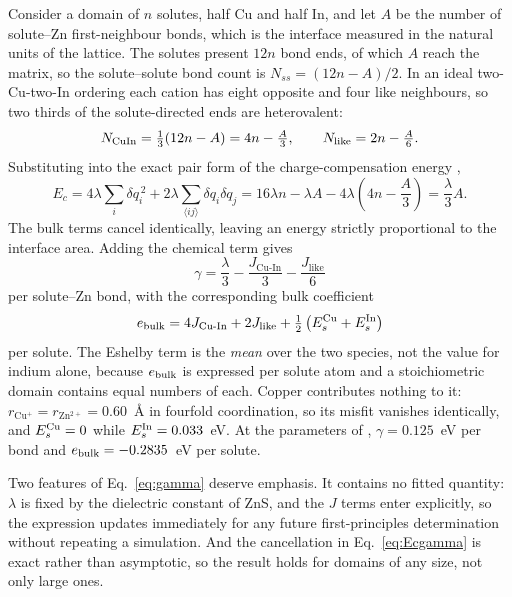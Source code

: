 \documentclass[preprint,12pt,authoryear]{elsarticle}
\newcommand{\JCuIn}{J_{\mathrm{Cu\text{-}In}}}
\newcommand{\Jlike}{J_{\mathrm{like}}}
\begin{document}
Consider a domain of $n$ solutes, half Cu and half In, and let $A$ be the number
of solute--Zn first-neighbour bonds, which is the interface measured in the
natural units of the lattice. The solutes present $12n$ bond ends, of which $A$
reach the matrix, so the solute--solute bond count is $N_{ss} = (12n - A)/2$. In
an ideal two-Cu-two-In ordering each cation has eight opposite and four like
neighbours, so two thirds of the solute-directed ends are heterovalent:
\begin{equation}
N_{\rm CuIn} = \tfrac{1}{3}(12n - A) = 4n - \tfrac{A}{3},
\qquad
N_{\rm like} = 2n - \tfrac{A}{6}.
\label{eq:bondcounts}
\end{equation}
Substituting into the exact pair form of the charge-compensation energy
\citep{yu2026},
\begin{equation}
E_c = 4\lambda \sum_i \delta q_i^{\,2}
    + 2\lambda \sum_{\langle ij \rangle} \delta q_i \delta q_j
    = 16\lambda n - \lambda A - 4\lambda\left(4n - \frac{A}{3}\right)
    = \frac{\lambda}{3} A .
\label{eq:Ecgamma}
\end{equation}
The bulk terms cancel identically, leaving an energy strictly proportional to
the interface area. Adding the chemical term gives
\begin{equation}
\boxed{\;
\gamma = \frac{\lambda}{3} - \frac{\JCuIn}{3} - \frac{\Jlike}{6}
\;}
\label{eq:gamma}
\end{equation}
per solute--Zn bond, with the corresponding bulk coefficient
\begin{equation}
e_{\rm bulk} = 4\JCuIn + 2\Jlike
             + \tfrac{1}{2}\left(E_s^{\rm Cu} + E_s^{\rm In}\right)
\label{eq:ebulk}
\end{equation}
per solute. The Eshelby term is the \emph{mean} over the two species, not the
value for indium alone, because $e_{\rm bulk}$ is expressed per solute atom and
a stoichiometric domain contains equal numbers of each. Copper contributes
nothing to it: $r_{\mathrm{Cu^+}} = r_{\mathrm{Zn^{2+}}} = 0.60$~\AA{} in
fourfold coordination, so its misfit vanishes identically, and
$E_s^{\rm Cu} = 0$ while $E_s^{\rm In} = 0.033$~eV. At the parameters of
\citet{yu2026}, $\gamma = 0.125$~eV per bond and $e_{\rm bulk} = -0.2835$~eV per
solute.

Two features of Eq.~\eqref{eq:gamma} deserve emphasis. It contains no fitted
quantity: $\lambda$ is fixed by the dielectric constant of ZnS, and the $J$
terms enter explicitly, so the expression updates immediately for any future
first-principles determination without repeating a simulation. And the
cancellation in Eq.~\eqref{eq:Ecgamma} is exact rather than asymptotic, so the
result holds for domains of any size, not only large ones.
\end{document}
